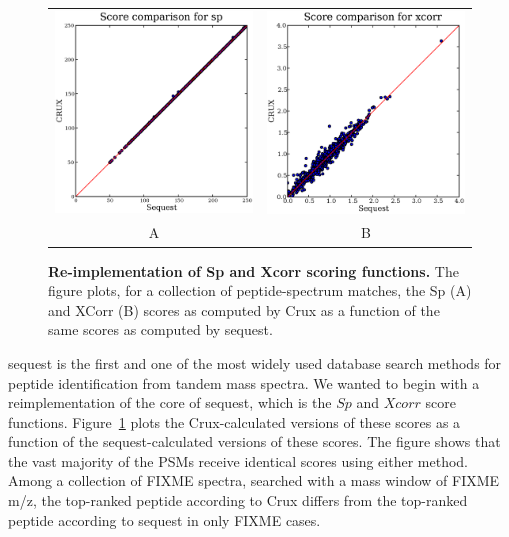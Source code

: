 \documentclass{bioinfo}
\begin{document}
\begin{figure}
  \centering
  \begin{tabular}{cc}
    \includegraphics[width=3in]{./Images/random-sp.eps} &
    \includegraphics[width=3in]{./Images/random-xcorr.eps} \\
  A & B \\
  \end{tabular}
  \caption{{\bf Re-implementation of Sp and Xcorr scoring functions.}
  The figure plots, for a collection of peptide-spectrum matches, the
  Sp (A) and XCorr (B) scores as computed by Crux as a function of the
  same scores as computed by {\sc sequest}.
  \label{figure:sp-xcorr}}
\end{figure}

{\sc sequest} is the first and one of the most widely used database search
methods for peptide identification from tandem mass spectra.  We
wanted to begin with a reimplementation of the core of {\sc sequest}, which
is the $Sp$ and $Xcorr$ score functions.  Figure~\ref{figure:sp-xcorr}
plots the Crux-calculated versions of these scores as a function of
the {\sc sequest}-calculated versions of these scores.  The figure shows
that the vast majority of the PSMs receive identical scores using
either method.  Among a collection of FIXME spectra, searched with a
mass window of FIXME m/z, the top-ranked peptide according to Crux
differs from the top-ranked peptide according to {\sc sequest} in only FIXME
cases.  
\end{document}
